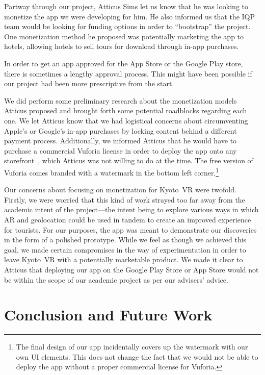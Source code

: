 \documentclass[a4paper, 10pt, american, titlepage]{article}
\begin{document}
Partway through our project, Atticus Sims let us know that he was looking to
monetize the app we were developing for him. He also informed us that the IQP
team would be looking for funding options in order to ``bootstrap'' the project.
One monetization method he proposed was potentially marketing the app to hotels,
allowing hotels to sell tours for download through in-app purchases.

In order to get an app approved for the App Store or the Google Play store,
there is sometimes a lengthy approval process. This might have been possible if
our project had been more prescriptive from the start.

We did perform some preliminary research about the monetization models Atticus
proposed and brought forth some potential roadblocks regarding each one. We let
Atticus know that we had logistical concerns about circumventing Apple's or
Google's in-app purchases by locking content behind a different payment process.
Additionally, we informed Atticus that he would have to purchase a commercial
Vuforia license in order to deploy the app onto any
storefront~\autocite{vuforialicense2018}, which Atticus was not willing to do at
the time. The free version of Vuforia comes branded with a watermark in the
bottom left corner.\footnote{The final design of our app incidentally covers up
the watermark with our own UI elements. This does not change the fact that we
would not be able to deploy the app without a proper commercial license for
Vuforia.}

Our concerns about focusing on monetization for Kyoto~VR were twofold. Firstly,
we were worried that this kind of work strayed too far away from the academic
intent of the project---the intent being to explore various ways in which AR and
geolocation could be used in tandem to create an improved experience for
tourists. For our purposes, the app was meant to demonstrate our discoveries in
the form of a polished prototype. While we feel as though we achieved this goal,
we made certain compromises in the way of experimentation in order to leave
Kyoto~VR with a potentially marketable product. We made it clear to Atticus that
deploying our app on the Google Play Store or App Store would not be within the
scope of our academic project as per our advisers' advice.

\clearpage

\section{Conclusion and Future Work}
\label{sec:conclusionAndFutureWork}
\end{document}
